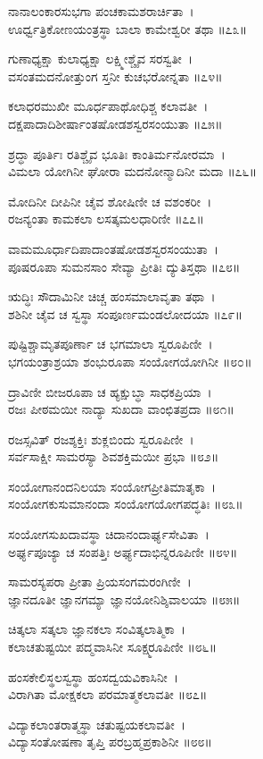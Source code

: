 ನಾನಾಲಂಕಾರಸುಭಗಾ ಪಂಚಕಾಮಶರಾರ್ಚಿತಾ~।\\
ಊರ್ಧ್ವತ್ರಿಕೋಣಯಂತ್ರಸ್ಥಾ ಬಾಲಾ ಕಾಮೇಶ್ವರೀ ತಥಾ ॥೭೩॥

	ಗುಣಾಧ್ಯಕ್ಷಾ ಕುಲಾಧ್ಯಕ್ಷಾ ಲಕ್ಷ್ಮೀಶ್ಚೈವ ಸರಸ್ವತೀ~।\\
	ವಸಂತಮದನೋತ್ತುಂಗ ಸ್ತನೀ ಕುಚಭರೋನ್ನತಾ ॥೭೪॥

ಕಲಾಧರಮುಖೀ ಮೂರ್ಧಪಾಥೋಧಿಶ್ಚ ಕಲಾವತೀ~।\\
ದಕ್ಷಪಾದಾದಿಶೀರ್ಷಾಂತಷೋಡಶಸ್ವರಸಂಯುತಾ ॥೭೫॥

	ಶ್ರದ್ಧಾ ಪೂರ್ತಿಃ ರತಿಶ್ಚೈವ ಭೂತಿಃ ಕಾಂತಿರ್ಮನೋರಮಾ~।\\
	ವಿಮಲಾ ಯೋಗಿನೀ ಘೋರಾ ಮದನೋನ್ಮಾದಿನೀ ಮದಾ ॥೭೬॥

ಮೋದಿನೀ ದೀಪಿನೀ ಚೈವ ಶೋಷಿಣೀ ಚ ವಶಂಕರೀ~।\\
ರಜನ್ಯಂತಾ ಕಾಮಕಲಾ ಲಸತ್ಕಮಲಧಾರಿಣೀ ॥೭೭॥

	ವಾಮಮೂರ್ಧಾದಿಪಾದಾಂತಷೋಡಶಸ್ವರಸಂಯುತಾ~।\\
	ಪೂಷರೂಪಾ ಸುಮನಸಾಂ ಸೇವ್ಯಾ ಪ್ರೀತಿಃ ದ್ಯುತಿಸ್ತಥಾ ॥೭೮॥

ಋದ್ಧಿಃ ಸೌದಾಮಿನೀ ಚಿಚ್ಚ ಹಂಸಮಾಲಾವೃತಾ ತಥಾ~।\\
ಶಶಿನೀ ಚೈವ ಚ ಸ್ವಸ್ಥಾ ಸಂಪೂರ್ಣಮಂಡಲೋದಯಾ ॥೭೯॥

	ಪುಷ್ಟಿಶ್ಚಾಮೃತಪೂರ್ಣಾ ಚ ಭಗಮಾಲಾ ಸ್ವರೂಪಿಣೀ~।\\
	ಭಗಯಂತ್ರಾಶ್ರಯಾ ಶಂಭುರೂಪಾ ಸಂಯೋಗಯೋಗಿನೀ ॥೮೦॥

ದ್ರಾವಿಣೀ ಬೀಜರೂಪಾ ಚ ಹ್ಯಕ್ಷುಬ್ಧಾ ಸಾಧಕಪ್ರಿಯಾ~।\\
ರಜಃ ಪೀಠಮಯೀ ನಾದ್ಯಾ ಸುಖದಾ ವಾಂಛಿತಪ್ರದಾ ॥೮೧॥

	ರಜಸ್ಸವಿತ್ ರಜಶ್ಶಕ್ತಿಃ ಶುಕ್ಲಬಿಂದು ಸ್ವರೂಪಿಣೀ~।\\
	ಸರ್ವಸಾಕ್ಷೀ ಸಾಮರಸ್ಯಾ ಶಿವಶಕ್ತಿಮಯೀ ಪ್ರಭಾ ॥೮೨॥

ಸಂಯೋಗಾನಂದನಿಲಯಾ ಸಂಯೋಗಪ್ರೀತಿಮಾತೃಕಾ~।\\
ಸಂಯೋಗಕುಸುಮಾನಂದಾ ಸಂಯೋಗಯೋಗಪದ್ಧತಿಃ ॥೮೩॥

	ಸಂಯೋಗಸುಖದಾವಸ್ಥಾ ಚಿದಾನಂದಾರ್ಘ್ಯಸೇವಿತಾ~।\\
	ಅರ್ಘ್ಯಪೂಜ್ಯಾ ಚ ಸಂಪತ್ತಿಃ ಅರ್ಘ್ಯದಾಭಿನ್ನರೂಪಿಣೀ ॥೮೪॥

ಸಾಮರಸ್ಯಪರಾ ಪ್ರೀತಾ ಪ್ರಿಯಸಂಗಮರಂಗಿಣೀ~।\\
ಜ್ಞಾನದೂತೀ ಜ್ಞಾನಗಮ್ಯಾ ಜ್ಞಾನಯೋನಿಶ್ಶಿವಾಲಯಾ ॥೮೫॥

	ಚಿತ್ಕಲಾ ಸತ್ಕಲಾ ಜ್ಞಾನಕಲಾ ಸಂವಿತ್ಕಲಾತ್ಮಿಕಾ~।\\
	ಕಲಾಚತುಷ್ಟಯೀ ಪದ್ಮವಾಸಿನೀ ಸೂಕ್ಷ್ಮರೂಪಿಣೀ ॥೮೬॥

ಹಂಸಕೇಲಿಸ್ಥಲಸ್ವಸ್ಥಾ ಹಂಸದ್ವಯವಿಕಾಸಿನೀ~।\\
ವಿರಾಗಿತಾ ಮೋಕ್ಷಕಲಾ ಪರಮಾತ್ಮಕಲಾವತೀ ॥೮೭॥

	ವಿದ್ಯಾಕಲಾಂತರಾತ್ಮಸ್ಥಾ ಚತುಷ್ಟಯಕಲಾವತೀ~।\\
	ವಿದ್ಯಾಸಂತೋಷಣಾ ತೃಪ್ತಿ ಪರಬ್ರಹ್ಮಪ್ರಕಾಶಿನೀ ॥೮೮॥

